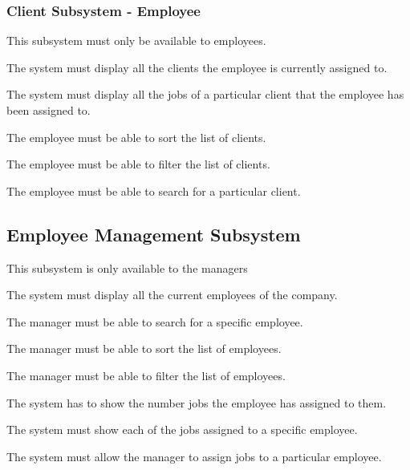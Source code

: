 \documentclass{article}
\begin{document}
	\subsubsection*{Client Subsystem - Employee}	
	\begin{list}{R.}{}
		\item This subsystem must only be available to employees.
		\item The system must display all the clients the employee is currently assigned to.
		\item The system must display all the jobs of a particular client that the employee has been assigned to.
		\item The employee must be able to sort the list of clients.
		\item The employee must be able to filter the list of clients.
		\item The employee must be able to search for a particular client. 		
	\end{list}
	
	\subsection*{Employee Management Subsystem}	
	\begin{list}{R.}{}
		\item This subsystem is only available to the managers
		\item The system must display all the current employees of the company.
		\item The manager must be able to search for a specific employee.
		\item The manager must be able to sort the list of employees.
		\item The manager must be able to filter the list of employees.
		\item The system has to show the number jobs the employee has assigned to them.
		\item The system must show each of the jobs assigned to a specific employee.
		\item The system must allow the manager to assign jobs to a particular employee.		
	\end{list}
	
\end{document}
